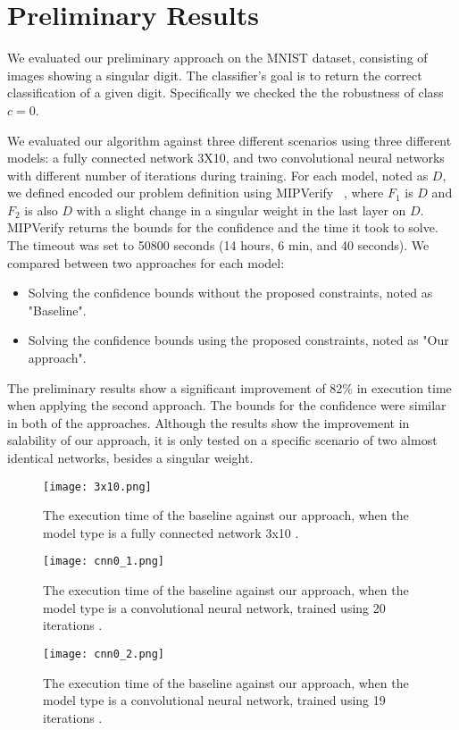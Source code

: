
\section{Preliminary Results}
We evaluated our preliminary approach on the MNIST dataset, consisting of images showing a singular digit.
The classifier's goal is to return the correct classification of a given digit. Specifically we checked the the robustness of class $c=0$.

We evaluated our algorithm against three different scenarios using three different models: a fully connected network 3X10, and two convolutional neural networks with different number of iterations during training. For each model, noted as $D$, we defined encoded our problem definition using MIPVerify ~\cite{MIPVERIFY}, where $F_1$ is $D$ and $F_2$ is also $D$ with a slight change in a singular weight in the last layer on $D$. MIPVerify returns the bounds for the confidence and the time it took to solve. The timeout was set to 50800 seconds (14 hours, 6 min, and 40 seconds). We compared between two approaches for each model:
\begin{itemize}
    \item Solving the confidence bounds without the proposed constraints, noted as "Baseline".
    \item Solving the confidence bounds using the proposed constraints, noted as "Our approach".
\end{itemize}
The preliminary results show a significant improvement of 82\% in execution time when applying the second approach.
The bounds for the confidence were similar in both of the approaches.
Although the results show the improvement in salability of our approach, it is only tested on a specific scenario of two almost identical networks, besides a singular weight.
\begin{figure}[ht]
  \centering
  \texttt{[image: 3x10.png]}
  \caption{The execution time of the baseline against our approach, when the model type is a fully connected network 3x10 .}
  \label{fig:3_x_10}
\end{figure}

\begin{figure}[ht]
  \centering
  \texttt{[image: cnn0\_1.png]}
  \caption{The execution time of the baseline against our approach, when the model type is a convolutional neural network, trained using 20 iterations .}
  \label{fig:cnn0_1}
\end{figure}

\begin{figure}[ht]
  \centering
  \texttt{[image: cnn0\_2.png]}
  \caption{The execution time of the baseline against our approach, when the model type is a convolutional neural network, trained using 19 iterations .}
  \label{fig:cnn0_2}
\end{figure}


